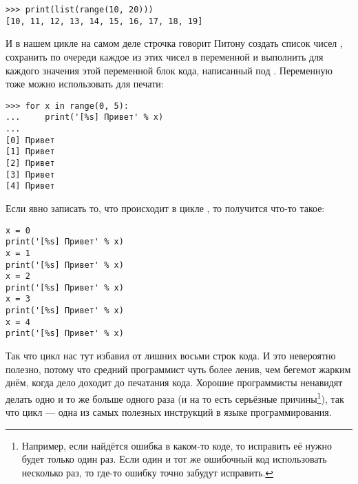 \begin{listing}
\begin{verbatim}
>>> print(list(range(10, 20)))
[10, 11, 12, 13, 14, 15, 16, 17, 18, 19]
\end{verbatim}
\end{listing}

И в нашем цикле  на самом деле строчка  говорит Питону создать список чисел \code{[0, 1, 2, 3, 4]}, сохранить по очереди каждое из этих чисел в переменной  и выполнить для каждого значения этой переменной блок кода, написанный под . Переменную  тоже можно использовать для печати:

\begin{listing}
\begin{verbatim}
>>> for x in range(0, 5):
...     print('[%s] Привет' % x)
...
[0] Привет
[1] Привет
[2] Привет
[3] Привет
[4] Привет
\end{verbatim}
\end{listing}

Если явно записать то, что происходит в цикле , то получится что-то такое:

\begin{listing}
\begin{verbatim}
x = 0
print('[%s] Привет' % x)
x = 1
print('[%s] Привет' % x)
x = 2
print('[%s] Привет' % x)
x = 3
print('[%s] Привет' % x)
x = 4
print('[%s] Привет' % x)
\end{verbatim}
\end{listing}

Так что цикл нас тут избавил от лишних восьми строк кода. И это невероятно полезно, потому что средний программист чуть более ленив, чем бегемот жарким днём, когда дело доходит до печатания кода. Хорошие программисты ненавидят делать одно и то же больше одного раза (и на то есть серьёзные причины\footnote{Например, если найдётся ошибка в каком-то коде, то исправить её нужно будет только один раз. Если один и тот же ошибочный код использовать несколько раз, то где-то ошибку точно забудут исправить.}), так что цикл — одна из самых полезных инструкций в языке программирования.

\linebreak

